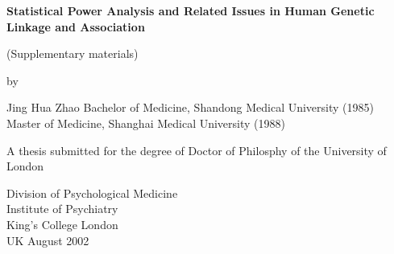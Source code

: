 \documentclass[11pt,a4paper]{iopthsis}
\begin{document}
\thispagestyle{empty}
\vskip 1.5cm
\begin{center}
{
\Large\bf
Statistical Power Analysis and Related Issues
in Human Genetic Linkage and Association
}

{\large(Supplementary materials)}

\vskip 2cm

{\large by}

\vskip 1cm

{
\Large
Jing Hua Zhao
}
\large\vskip 0.5cm
Bachelor of Medicine, Shandong Medical University (1985)\\
Master of Medicine, Shanghai Medical University (1988)\\

\vskip 1cm

{\large
A thesis submitted for the degree of Doctor of Philosphy of the University of
London}

\vskip 7cm


{
\Large
Division of Psychological Medicine\\
Institute of Psychiatry\\
King's College London\\ \vskip 0.3cm
UK
\vskip 1cm
{\large August 2002}
}
\end{center}
\end{document}
